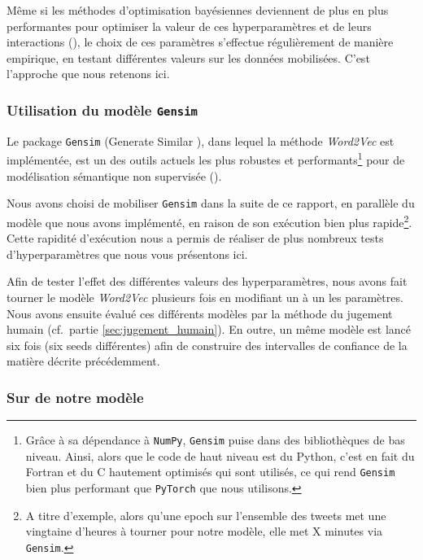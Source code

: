 \documentclass[11pt,french,french]{article}
\let\rmarkdownfootnote\footnote%
\def\footnote{\protect\rmarkdownfootnote}
\begin{document}
Même si les méthodes d'optimisation bayésiennes deviennent de plus en
plus performantes pour optimiser la valeur de ces hyperparamètres et de
leurs interactions (\cite{Hutter}), le choix de ces paramètres
s'effectue régulièrement de manière empirique, en testant différentes
valeurs sur les données mobilisées. C'est l'approche que nous retenons
ici.

\hypertarget{utilisation-du-moduxe8le-gensim}{%
\subsubsection{\texorpdfstring{Utilisation du modèle
\texttt{Gensim}}{Utilisation du modèle Gensim}}\label{utilisation-du-moduxe8le-gensim}}

Le package \texttt{Gensim} (\og Generate Similar \fg), dans lequel la
méthode \emph{Word2Vec} est implémentée, est un des outils actuels les
plus robustes et performants\footnote{Grâce à sa dépendance à
  \texttt{NumPy}, \texttt{Gensim} puise dans des bibliothèques de bas
  niveau. Ainsi, alors que le code de haut niveau est du Python, c'est
  en fait du Fortran et du C hautement optimisés qui sont utilisés, ce
  qui rend \texttt{Gensim} bien plus performant que \texttt{PyTorch} que
  nous utilisons.} pour de modélisation sémantique non supervisée
(\cite{Rehurek}).

Nous avons choisi de mobiliser \texttt{Gensim} dans la suite de ce
rapport, en parallèle du modèle que nous avons implémenté, en raison de
son exécution bien plus rapide\footnote{A titre d'exemple, alors qu'une
  epoch sur l'ensemble des tweets met une vingtaine d'heures à tourner
  pour \og notre \fg modèle, elle met \colorbox{BurntOrange}{X minutes}
  via \texttt{Gensim}.}. Cette rapidité d'exécution nous a permis de
réaliser de plus nombreux tests d'hyperparamètres que nous vous
présentons ici.

Afin de tester l'effet des différentes valeurs des hyperparamètres, nous
avons fait tourner le modèle \emph{Word2Vec} plusieurs fois en modifiant
un à un les paramètres. Nous avons ensuite évalué ces différents modèles
par la méthode du \og jugement humain \fg (cf.~partie
\ref{sec:jugement_humain}). En outre, un même modèle est lancé six fois
(six \og seeds \fg différentes) afin de construire des intervalles de
confiance de la matière décrite précédemment.

\hypertarget{sur-de-notre-moduxe8le}{%
\subsubsection{\texorpdfstring{Sur de \og notre
\fg modèle}{Sur de notre modèle}}\label{sur-de-notre-moduxe8le}}
\end{document}
